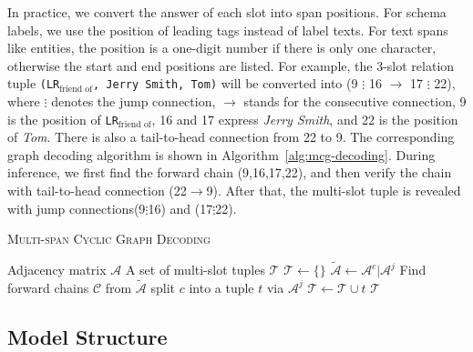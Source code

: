 In practice, we convert the answer of each slot into span positions.
For schema labels, we use the position of leading tags instead of label texts.
For text spans like entities, the position is a one-digit number if there is only one character, otherwise the start and end positions are listed.
For example, the 3-slot relation tuple \texttt{(LR$_{\text{friend of}}$, Jerry Smith, Tom)} will be converted into (9 {\color[HTML]{695efb} $\vdots$} 16 $\to$ 17 {\color[HTML]{695efb} $\vdots$} 22), where $\vdots$ denotes the jump connection, $\to$ stands for the consecutive connection, 9 is the position of \texttt{LR$_{\text{friend of}}$}, 16 and 17 express \textit{Jerry Smith}, and 22 is the position of \textit{Tom}.
There is also a tail-to-head connection from 22 to 9.
The corresponding graph decoding algorithm is shown in Algorithm~\ref{alg:mcg-decoding}.
During inference, we first find the forward chain (9,16,17,22), and then verify the chain with tail-to-head connection (22$\to$9).
After that, the multi-slot tuple is revealed with jump connections(9$\vdots$16) and (17$\vdots$22).

\begin{algorithm}[t]
    \renewcommand{\algorithmicrequire}{\textbf{Input:}}
    \renewcommand{\algorithmicensure}{\textbf{Output:}}
    \caption{\textsc{Multi-span Cyclic Graph Decoding}}
    \label{alg:mcg-decoding}
    \begin{algorithmic}[1]
        \Require Adjacency matrix $\mathcal{A}$
        \Ensure A set of multi-slot tuples $\mathcal{T}$
        \State $\mathcal{T} \gets \{\}$
        \State $\tilde{\mathcal{A}} \gets \mathcal{A}^{c} | \mathcal{A}^{j}$ 
        \State Find forward chains $\mathcal{C}$ from $\tilde{\mathcal{A}}$
                \State split $c$ into a tuple $t$ via $\mathcal{A}^j$
                \State $\mathcal{T} \gets \mathcal{T} \cup t$
            \EndIf
        \EndFor
        \State \Return $\mathcal{T}$
    \end{algorithmic}
\end{algorithm}


\subsection{Model Structure}

